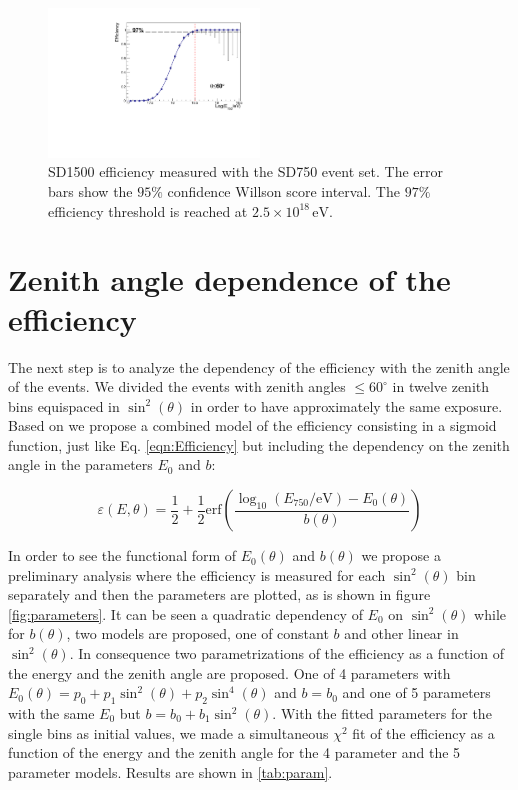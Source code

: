 \documentclass[12pt,a4paper]{article}
\newcommand{\eV}{\, \mathrm{eV}}
\begin{document}
\begin{figure}[h]
    \begin{center}
        \includegraphics[width=0.5\textwidth]{plots/allZenith.pdf}  
        \caption{SD1500 efficiency measured with the SD750 event set. The error bars show the $95\%$ confidence Willson score interval. The $97\%$ efficiency threshold is reached at $2.5\times10^{18}\eV$.
        \label{fig:allZenith}}
    \end{center}
\end{figure}




\section{Zenith angle dependence of the efficiency}
\label{sec:zenith}

The next step is to analyze the dependency of the efficiency with the zenith angle of the events. We divided the events with zenith angles $\leq60^{\circ}$ in twelve zenith bins equispaced in $\sin^2(\theta)$ in order to have approximately the same exposure. Based on \cite{VerticalSpectrum} we propose a combined model of the efficiency consisting in a sigmoid function, just like Eq. \ref{eqn:Efficiency} but including the dependency on the zenith angle in the parameters $E_0$ and $b$:

\begin{equation}
\varepsilon(E,\theta)=\frac{1}{2} + \frac{1}{2}\mathrm{erf}\left(\frac{\log_{10}(E_{750}/\mathrm{eV})-E_{0}(\theta)}{b(\theta)}\right)
\label{eqn:EffiZenith}
\end{equation}

In order to see the functional form of $E_0(\theta)$ and $b(\theta)$ we propose a preliminary analysis where the efficiency is measured for each $\sin^2(\theta)$ bin separately and then the parameters are plotted, as is shown in figure \ref{fig:parameters}. It can be seen a quadratic dependency of $E_0$ on $\sin^2(\theta)$ while for $b(\theta)$, two models are proposed, one of constant $b$ and other linear in $\sin^2(\theta)$. In consequence two parametrizations of the efficiency as a function of the energy and the zenith angle are proposed. One of 4 parameters with $E_0(\theta)=p_0 + p_1\sin^2(\theta) + p_2\sin^4(\theta)$ and $b=b_0$ and one of 5 parameters with the same $E_0$ but $b=b_0+b_1\sin^2(\theta)$. With the fitted parameters for the single bins as initial values, we made a simultaneous $\chi^2$ fit of the efficiency as a function of the energy and the zenith angle for the 4 parameter and the 5 parameter models. Results are shown in \ref{tab:param}.
\end{document}
